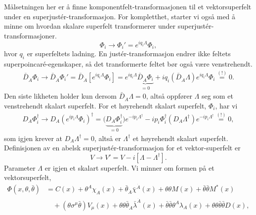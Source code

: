 \documentclass[notes.tex]{subfiles}
\begin{document}
\begin{Answer}
Målsetningen her er å finne komponentfelt-transformasjonen til et vektorsuperfelt under en superjustér-transformasjon. For kompletthet, starter vi også med å minne om hvordan skalare superfelt transformerer under superjustér-transformasjoner.
\begin{equation*}
    \Phi_i \to \Phi_i' = e^{i q_i \Lambda}\Phi_i,
\end{equation*}
hvor $q_i$ er superfeltets ladning. En justér-transformasjon endrer ikke feltets superpoincaré-egenskaper, så det transformerte feltet bør også være venstrehendt.
\begin{align*}
    \bar{D}_{\dot{A}}\Phi_i \to \bar{D}_{\dot{A}}\Phi_i' = \bar{D}_{\dot{A}}\left[e^{i q_i \Lambda}\Phi_i\right] = e^{iq_i \Lambda}\underbrace{\bar{D}_{\dot{A}}\Phi_i}_{=0} + iq_i\left(\bar{D}_{\dot{A}}\Lambda\right)e^{i q_i \Lambda}\Phi_i \overset{(!)}{=} 0.
\end{align*}
Den siste likheten holder kun dersom $\bar{D}_{\dot{A}}\Lambda = 0$, altså oppfører $\Lambda$ seg som et venstrehendt skalart superfelt. For et høyrehendt skalart superfelt, $\Phi_i$, har vi 
\begin{align*}
    D_A \Phi_i^\dagger \to D_A \left(e^{i p_i \Lambda}\Phi_i\right)^\dagger = \big(\underbrace{D_A \Phi_i^\dagger}_{=0}\big)e^{-i p_i \Lambda^\dagger} - i p_i \Phi_i^\dagger\left(D_A \Lambda^\dagger\right)e^{- i p_i \Lambda^\dagger} \overset{(!)}{=} 0,
\end{align*}
som igjen krever at $D_A\Lambda^\dagger = 0$, altså er $\Lambda^\dagger$ et høyrehendt skalart superfelt.
Definisjonen av en abelsk superjustér-transformasjon for et vektor-superfelt er 
\begin{equation*}
    V \to V' = V - i \left[\Lambda - \Lambda^\dagger\right].
\end{equation*}
Parameter $\Lambda$ er igjen et skalart superfelt. Vi minner om formen på et vektorsuperfelt,
\begin{equation}
    \begin{aligned}
        \Phi(x, \theta, \bar{\theta}) &= C(x) + \theta^{A}\chi_A(x) + \bar{\theta}_{\dot{A}}\bar{\chi}^{\dot{A}}(x) + \theta \theta M(x) + \bar{\theta}\bar{\theta}M^*(x) \\
        & \quad + (\theta \sigma^\mu \bar{\theta})V_{\mu}(x) + \theta \theta \bar{\theta}_{\dot{A}}\bar{\lambda}^{\dot{A}}(x) + \bar{\theta}\bar{\theta}\theta^A\lambda_{A}(x) + \theta\theta \bar{\theta}\bar{\theta}D(x),
    \end{aligned}

\end{equation}
\end{Answer}
\end{document}
